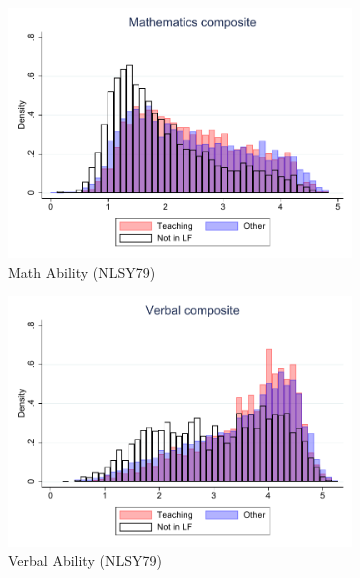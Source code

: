 \documentclass[onehalfspacing,11pt]{article}
\begin{document}
\begin{figure}
	\begin{subfigure}{0.49\textwidth}
		\includegraphics[width=\linewidth]{NLSY79_Mathematics_occ.pdf}
		\caption{Math Ability (NLSY79)} \label{fig:nlsy79math}
	\end{subfigure}
	\hspace*{\fill} %
	\begin{subfigure}{0.49\textwidth}
		\includegraphics[width=\linewidth]{NLSY79_Verbal_occ.pdf}
		\caption{Verbal Ability (NLSY79)} \label{fig:nlsy79word}
	\end{subfigure}
		\begin{subfigure}{0.49\textwidth}

\end{subfigure}
\end{figure}
\end{document}
